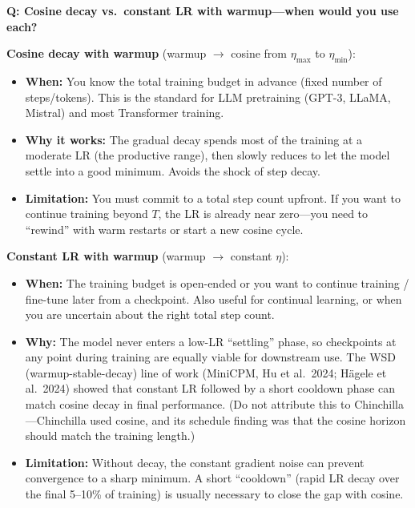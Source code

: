 \begin{interviewq}
\textbf{Q: Cosine decay vs.\ constant LR with warmup---when would you use each?}

 \quad {} \quad \badgefreq{\freqmed}

\stronganswer

\textbf{Cosine decay with warmup} (warmup $\to$ cosine from $\eta_{\max}$ to $\eta_{\min}$):
\begin{itemize}
    \item \textbf{When:} You know the total training budget in advance (fixed number of steps/tokens). This is the standard for LLM pretraining (GPT-3, LLaMA, Mistral) and most Transformer training.
    \item \textbf{Why it works:} The gradual decay spends most of the training at a moderate LR (the productive range), then slowly reduces to let the model settle into a good minimum. Avoids the shock of step decay.
    \item \textbf{Limitation:} You must commit to a total step count upfront. If you want to continue training beyond $T$, the LR is already near zero---you need to ``rewind'' with warm restarts or start a new cosine cycle.
\end{itemize}

\textbf{Constant LR with warmup} (warmup $\to$ constant $\eta$):
\begin{itemize}
    \item \textbf{When:} The training budget is open-ended or you want to continue training / fine-tune later from a checkpoint. Also useful for continual learning, or when you are uncertain about the right total step count.
    \item \textbf{Why:} The model never enters a low-LR ``settling'' phase, so checkpoints at any point during training are equally viable for downstream use. The WSD (warmup-stable-decay) line of work (MiniCPM, Hu et al.\ 2024; H\"{a}gele et al.\ 2024) showed that constant LR followed by a short cooldown phase can match cosine decay in final performance. (Do not attribute this to Chinchilla---Chinchilla used cosine, and its schedule finding was that the cosine horizon should match the training length.)
    \item \textbf{Limitation:} Without decay, the constant gradient noise can prevent convergence to a sharp minimum. A short ``cooldown'' (rapid LR decay over the final 5--10\% of training) is usually necessary to close the gap with cosine.
\end{itemize}


\end{interviewq}
